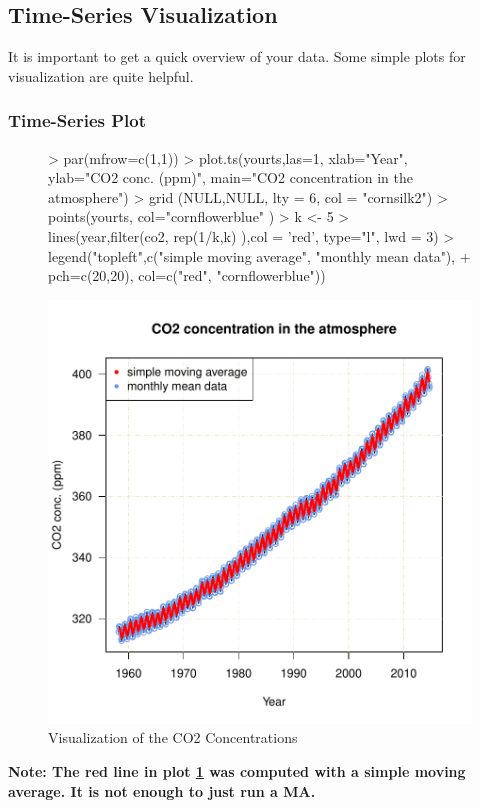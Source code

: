 \documentclass[11pt, a4paper]{article} %
\begin{document}
\pagebreak

\subsection{Time-Series Visualization}%
It is important to get a quick overview of your data. Some simple plots for visualization are quite helpful.
\subsubsection{Time-Series Plot}
\begin{figure}[H]
\centering
\begin{Schunk}
\begin{Sinput}
> par(mfrow=c(1,1))
> plot.ts(yourts,las=1, xlab="Year", ylab="CO2 conc. (ppm)", main="CO2 concentration in the atmosphere")
> grid (NULL,NULL, lty = 6, col = "cornsilk2")
> points(yourts, col="cornflowerblue" )
> k <- 5
> lines(year,filter(co2, rep(1/k,k) ),col = 'red', type="l", lwd = 3)
> legend("topleft",c("simple moving average", "monthly mean data"),
+ pch=c(20,20), col=c("red", "cornflowerblue"))
\end{Sinput}
\end{Schunk}
\includegraphics{sweaveclean-fig1visualize}
\caption{Visualization of the CO2 Concentrations}
\label{fig1visualize}
\end{figure}
\noindent \textbf{Note: The red line in plot \ref{fig1visualize} was computed with a simple moving average. It is not enough to just run a MA.}\\
\end{document}

